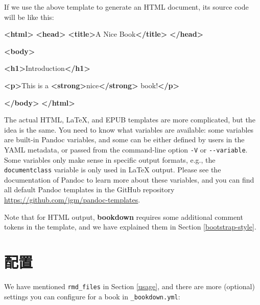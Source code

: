 \documentclass[
  12pt,
]{krantz}
\newenvironment{Shaded}{\begin{snugshade}}{\end{snugshade}}
\newcommand{\KeywordTok}[1]{\textcolor[rgb]{0.13,0.29,0.53}{\textbf{#1}}}
\newcommand{\NormalTok}[1]{#1}
\theoremstyle{definition}
\theoremstyle{definition}
\theoremstyle{definition}
\theoremstyle{definition}
\theoremstyle{remark}
\begin{document}
If we use the above template to generate an HTML document, its source code will be like this:

\begin{Shaded}
\begin{Highlighting}[]
\KeywordTok{\textless{}html\textgreater{}}
  \KeywordTok{\textless{}head\textgreater{}}
    \KeywordTok{\textless{}title\textgreater{}}\NormalTok{A Nice Book}\KeywordTok{\textless{}/title\textgreater{}}
  \KeywordTok{\textless{}/head\textgreater{}}
  
  \KeywordTok{\textless{}body\textgreater{}}
  
  \KeywordTok{\textless{}h1\textgreater{}}\NormalTok{Introduction}\KeywordTok{\textless{}/h1\textgreater{}}
  
  \KeywordTok{\textless{}p\textgreater{}}\NormalTok{This is a }\KeywordTok{\textless{}strong\textgreater{}}\NormalTok{nice}\KeywordTok{\textless{}/strong\textgreater{}}\NormalTok{ book!}\KeywordTok{\textless{}/p\textgreater{}}
  
  \KeywordTok{\textless{}/body\textgreater{}}
\KeywordTok{\textless{}/html\textgreater{}}
\end{Highlighting}
\end{Shaded}

The actual HTML, LaTeX, and EPUB templates are more complicated, but the idea is the same. You need to know what variables are available: some variables are built-in Pandoc variables, and some can be either defined by users in the YAML metadata, or passed from the command-line option \texttt{-V} or \texttt{-\/-variable}. Some variables only make sense in specific output formats, e.g., the \texttt{documentclass} variable is only used in LaTeX output. Please see the documentation of Pandoc to learn more about these variables, and you can find all default Pandoc templates in the GitHub repository \url{https://github.com/jgm/pandoc-templates}.

Note that for HTML output, \textbf{bookdown} requires some additional comment tokens in the template, and we have explained them in Section \ref{bootstrap-style}.

\hypertarget{configuration}{%
\section{配置}\label{configuration}}

We have mentioned \texttt{rmd\_files} in Section \ref{usage}, and there are more (optional) settings you can configure for a book in \texttt{\_bookdown.yml}:
\end{document}
